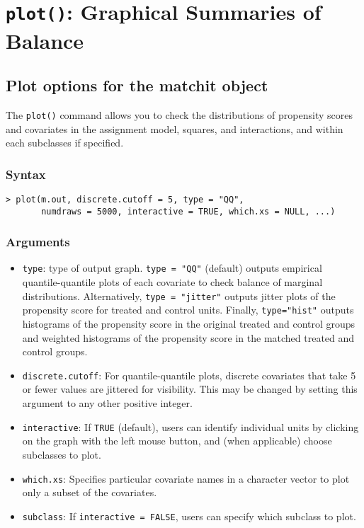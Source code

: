 \section{\texttt{plot()}: Graphical Summaries of Balance}


\subsection{Plot options for the matchit object}
The \texttt{plot()} command allows you to check the distributions of
propensity scores and covariates in the assignment model, squares, and interactions, and
within each subclasses if specified.  

\subsubsection{Syntax}

\begin{verbatim}
> plot(m.out, discrete.cutoff = 5, type = "QQ", 
       numdraws = 5000, interactive = TRUE, which.xs = NULL, ...)
\end{verbatim}

\subsubsection{Arguments}

\begin{itemize}
\item {\tt type}: type of output graph. \texttt{type = "QQ"}
  (default) outputs empirical quantile-quantile plots of each
  covariate to check balance of marginal distributions. Alternatively,
  \texttt{type = "jitter"} outputs jitter plots of the propensity
  score for treated and control units.  Finally, \texttt{type="hist"} outputs  
  histograms of the propensity score in the original treated and control groups
  and weighted histograms of the propensity score in the matched treated and control groups.
  
\item {\tt discrete.cutoff}: For quantile-quantile plots, discrete
  covariates that take 5 or fewer values are jittered for visibility.
  This may be changed by setting this argument to any other positive
  integer.
  
\item {\tt interactive}: If \texttt{TRUE} (default), users can
  identify individual units by clicking on the graph with the left
  mouse button, and (when applicable) choose subclasses to plot.
  
\item {\tt which.xs}: Specifies particular covariate names in a
  character vector to plot only a subset of the covariates.

\item {\tt subclass}: If \texttt{interactive = FALSE}, users can
  specify which subclass to plot. 

\end{itemize}

